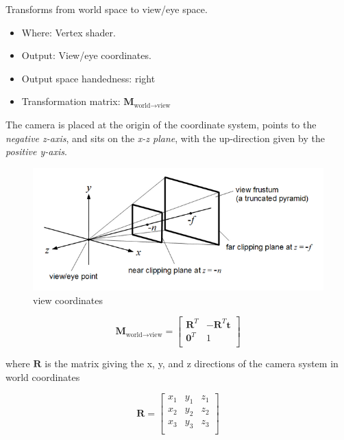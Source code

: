 \documentclass{scrartcl}
\begin{document}
        Transforms from world space to view/eye space.
         
        \begin{itemize}
            \item Where: Vertex shader.
            \item Output: View/eye coordinates.
            \item Output space handedness: right
            \item Transformation matrix: \(\mathbf{M}_{\text{world}\to\text{view}}\)   
        \end{itemize}
              

        The camera is placed at the origin of the coordinate system, points to the \textit{negative z-axis}, and sits on the\textit{ x-z plane}, with the up-direction given by the \textit{positive y-axis}. 
        
        
        \begin{figure}
            \centering
            \includegraphics[width=0.8\linewidth]{view-coordinates}
            \caption{view coordinates}
            \label{fig:view-coordinates}
        \end{figure}
        
        
        \[
        \mathbf{M}_{\text{world}\to \text{view}} =
        \begin{bmatrix}
           \mathbf{R}^T & -\mathbf{R}^T \mathbf{t} \\
            \mathbf{0}^T &1 \\
        \end{bmatrix} 
        \]
        
        where $\mathbf{R}$ is the matrix giving the x, y, and z directions of the camera system in world coordinates
        
        \[
        \mathbf{R} =
        \begin{bmatrix}
           x_1 & y_1 & z_1 \\
           x_2 & y_2 & z_2 \\
           x_3 & y_3 & z_3 \\
        \end{bmatrix} 
        \]
        
\end{document}
